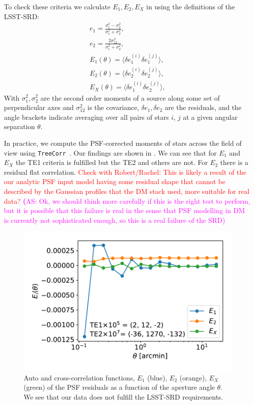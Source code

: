 \documentclass[twocolumn]{aastex62}
\newcommand{\as}[1]{{\textcolor{magenta}{{\textbf (AS: #1)}}}}
\begin{document}
To check these criteria we calculate $E_{1}, E_{2}, E_{X}$ in using the definitions of the LSST-SRD:
\begin{eqnarray}
e_{1} = \frac{\sigma^{2}_{1} - \sigma^{2}_{2}}{\sigma_{1}^{2}+\sigma_{2}^{2}},\\
e_{2} = \frac{2\sigma^{2}_{12}}{\sigma_{1}^{2}+\sigma_{2}^{2}},\\
E_{1} (\theta) = \langle \delta e^{(i)}_{1}\delta e^{(j)}_{1} \rangle,\\
E_{2} (\theta) = \langle \delta e^{(i)}_{2}\delta e^{(j)}_{2} \rangle,\\
E_{X} (\theta) = \langle \delta e^{(i)}_{1}\delta e^{(j)}_{2} \rangle,
\end{eqnarray}
With $\sigma_{1}^{2}, \sigma_{2}^{2}$ are the second order moments of a source along some set of perpendicular axes and $\sigma^{2}_{12}$ is the covariance, $\delta e_{1}, \delta e_{2}$ are the residuals, and the angle brackets indicate averaging over all pairs of stars $i$, $j$ at a given angular separation $\theta$.

In practice, we compute the PSF-corrected moments of stars across the field of view using \texttt{TreeCorr}~\citep{2004MNRAS.352..338J}. Our findings are shown in . We can see that for $E_{1}$ and $E_{X}$ the TE1 criteria is fulfilled but the TE2 and others are not. For $E_{2}$ there is a residual flat correlation. \textcolor{red}{Check with Robert/Rachel: This is likely a result of the our analytic PSF input model having some residual shape that cannot be described by the Gaussian profiles that the DM stack used, more suitable for real data?} \as{Ok, we should think more carefully if this is the right test to perform, but it is possible that this failure is real in the sense that PSF modelling in DM is currently not sophisticated enough, so this is a real failure of the SRD}
\begin{figure}
\centering
\includegraphics[width=0.9\columnwidth]{TEx}
\caption{Auto and cross-correlation functions, $E_{1}$ (blue), $E_{2}$ (orange), $E_{X}$ (green) of the PSF residuals as a function of the aperture angle $\theta$. We see that our data does not fulfill the LSST-SRD requirements.}
\label{fig:TEx}
\end{figure}
\end{document}
